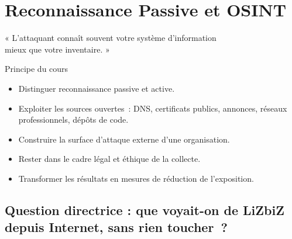
\chapter{Reconnaissance Passive et OSINT}
\label{chap:osint}

\epigraph{%
    « L'attaquant connaît souvent votre système d'information\\
    mieux que votre inventaire. »%
}{Principe du cours}


\begin{boxobjectifs}
\begin{itemize}
    \item Distinguer reconnaissance passive et active.
    \item Exploiter les sources ouvertes~: DNS, certificats publics,
          annonces, réseaux professionnels, dépôts de code.
    \item Construire la surface d'attaque externe d'une organisation.
    \item Rester dans le cadre légal et éthique de la collecte.
    \item Transformer les résultats en mesures de réduction de l'exposition.
\end{itemize}
\end{boxobjectifs}

\bigskip

\section*{Question directrice : que voyait-on de LiZbiZ depuis Internet, sans rien toucher~?}

